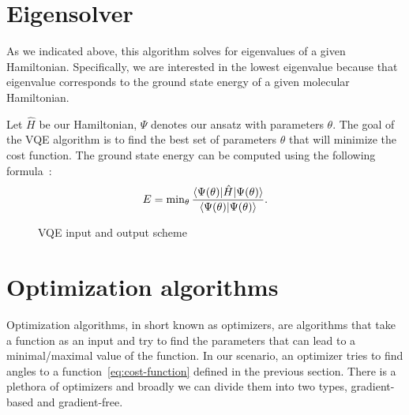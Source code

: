 \section{Eigensolver}
As we indicated above, this algorithm solves for eigenvalues of a given Hamiltonian. Specifically, we are interested in the lowest eigenvalue because that eigenvalue corresponds to the ground state energy of a given molecular Hamiltonian. 

Let $\hat{H}$ be our Hamiltonian, $\Psi$ denotes our ansatz with parameters $\theta$. The goal of the VQE algorithm is to find the best set of parameters $\theta$ that will minimize the cost function. The ground state energy can be computed using the following formula~\cite{vqe_method}:
\begin{equation}\label{eq:cost-function}
E = \min\nolimits_{\theta} \frac{\langle\Psi(\theta)\rvert\hat{H}\lvert\Psi(\theta)\rangle}{\langle\Psi(\theta)\vert\Psi(\theta)\rangle} \text{.}
\end{equation}

\begin{figure}[H] 
    \caption{VQE input and output scheme}
\end{figure}

\section{Optimization algorithms}
Optimization algorithms, in short known as optimizers, are algorithms that take a function as an input and try to find the parameters that can lead to a minimal/maximal value of the function. In our scenario, an optimizer tries to find angles to a function~\ref{eq:cost-function} defined in the previous section. There is a plethora of optimizers and broadly we can divide them into two types, gradient-based and gradient-free.

